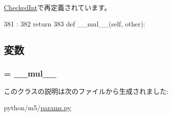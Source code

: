 \hyperlink{classm5_1_1params_1_1CheckedInt_a5c5703e7ec69bc87b19ba3165760ea36}{CheckedInt}で再定義されています。


\begin{DoxyCode}
381                     :
382         return
383 
    def __mul__(self, other):
\end{DoxyCode}


\subsection{変数}
\hypertarget{classm5_1_1params_1_1NumericParamValue_a0d6f9f52e4ec8af916d462d238cd25b1}{
\subsubsection[{\_\-\_\-rmul\_\-\_\-}]{ = \_\-\_\-mul\_\-\_\-}}
\label{classm5_1_1params_1_1NumericParamValue_a0d6f9f52e4ec8af916d462d238cd25b1}


このクラスの説明は次のファイルから生成されました:\begin{DoxyCompactItemize}
\item 
python/m5/\hyperlink{params_8py}{params.py}\end{DoxyCompactItemize}
